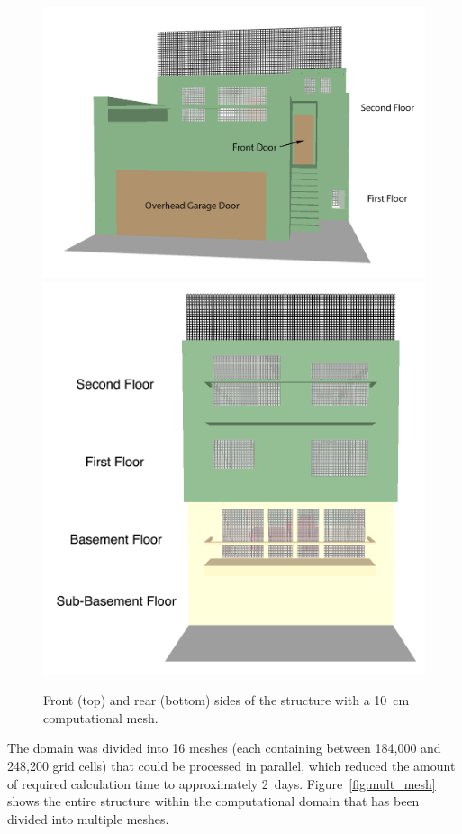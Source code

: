 \documentclass[12pt,oneside]{book}
\begin{document}
\begin{figure}[!ht]
\includegraphics[width=5.0in]{../Figures/SMV_Exterior_Grid_Front} \\
\includegraphics[width=4.5in]{../Figures/SMV_Exterior_Grid_Rear}
\caption[Front and rear of the structure with a 10~cm computational mesh.]
{Front (top) and rear (bottom) sides of the structure with a 10~cm computational mesh.}
\label{fig:SMV_exterior_grid}
\end{figure}


\clearpage


The domain was divided into 16 meshes (each containing between 184,000 and 248,200 grid cells) that could be processed in parallel, which reduced the amount of required calculation time to approximately 2~days. Figure~\ref{fig:mult_mesh} shows the entire structure within the computational domain that has been divided into multiple meshes.
\end{document}
